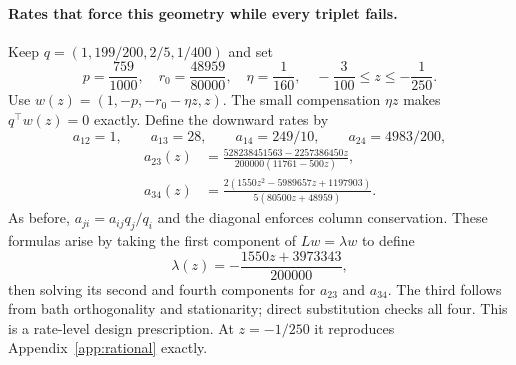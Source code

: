 \documentclass[11pt]{article}
\begin{document}
\paragraph{Rates that force this geometry while every triplet fails.}
Keep $q=(1,199/200,2/5,1/400)$ and set
\[
p=\frac{759}{1000},\quad r_0=\frac{48959}{80000},\quad
\eta=\frac1{160},\quad -\frac3{100}\leq z\leq-\frac1{250}.
\]
Use $w(z)=(1,-p,-r_0-\eta z,z)$. The small compensation $\eta z$ makes $q^\top w(z)=0$ exactly. Define the downward rates by
\[
a_{12}=1,\qquad a_{13}=28,\qquad a_{14}=249/10,\qquad a_{24}=4983/200,
\]
\begin{align*}
a_{23}(z)&=\frac{528238451563-2257386450z}{200000(11761-500z)},\\
a_{34}(z)&=\frac{2(1550z^2-5989657z+1197903)}{5(80500z+48959)}.
\end{align*}
As before, $a_{ji}=a_{ij}q_j/q_i$ and the diagonal enforces column conservation. These formulas arise by taking the first component of $Lw=\lambda w$ to define
\[
\lambda(z)=-\frac{1550z+3973343}{200000},
\]
then solving its second and fourth components for $a_{23}$ and $a_{34}$. The third follows from bath orthogonality and stationarity; direct substitution checks all four. This is a rate-level design prescription. At $z=-1/250$ it reproduces Appendix~\ref{app:rational} exactly.
\end{document}
